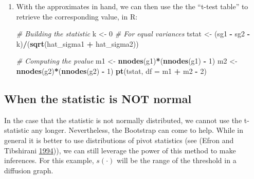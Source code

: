 \documentclass[]{book}
\newenvironment{Shaded}{\begin{snugshade}}{\end{snugshade}}
\newcommand{\CommentTok}[1]{\textcolor[rgb]{0.56,0.35,0.01}{\textit{#1}}}
\newcommand{\DataTypeTok}[1]{\textcolor[rgb]{0.13,0.29,0.53}{#1}}
\newcommand{\DecValTok}[1]{\textcolor[rgb]{0.00,0.00,0.81}{#1}}
\newcommand{\KeywordTok}[1]{\textcolor[rgb]{0.13,0.29,0.53}{\textbf{#1}}}
\newcommand{\NormalTok}[1]{#1}
\newcommand{\OperatorTok}[1]{\textcolor[rgb]{0.81,0.36,0.00}{\textbf{#1}}}
\newcommand{\StringTok}[1]{\textcolor[rgb]{0.31,0.60,0.02}{#1}}
\begin{document}
\begin{enumerate}
\begin{Shaded}
\end{Shaded}
\item
  With the approximates in hand, we can then use the the ``t-test table'' to
  retrieve the corresponding value, in R:

\begin{Shaded}
\begin{Highlighting}[]
\CommentTok{# Building the statistic}
\NormalTok{k <-}\StringTok{ }\DecValTok{0} \CommentTok{# For equal variances}
\NormalTok{tstat <-}\StringTok{ }\NormalTok{(sg1 }\OperatorTok{-}\StringTok{ }\NormalTok{sg2 }\OperatorTok{-}\StringTok{ }\NormalTok{k)}\OperatorTok{/}\NormalTok{(}\KeywordTok{sqrt}\NormalTok{(hat_sigma1 }\OperatorTok{+}\StringTok{ }\NormalTok{hat_sigma2))}

\CommentTok{# Computing the pvalue}
\NormalTok{m1 <-}\StringTok{ }\KeywordTok{nnodes}\NormalTok{(g1)}\OperatorTok{*}\NormalTok{(}\KeywordTok{nnodes}\NormalTok{(g1) }\OperatorTok{-}\StringTok{ }\DecValTok{1}\NormalTok{)}
\NormalTok{m2 <-}\StringTok{ }\KeywordTok{nnodes}\NormalTok{(g2)}\OperatorTok{*}\NormalTok{(}\KeywordTok{nnodes}\NormalTok{(g2) }\OperatorTok{-}\StringTok{ }\DecValTok{1}\NormalTok{)}
\KeywordTok{pt}\NormalTok{(tstat, }\DataTypeTok{df =}\NormalTok{ m1 }\OperatorTok{+}\StringTok{ }\NormalTok{m2 }\OperatorTok{-}\StringTok{ }\DecValTok{2}\NormalTok{)}
\end{Highlighting}
\end{Shaded}
\end{enumerate}

\hypertarget{when-the-statistic-is-not-normal}{%
\subsection{When the statistic is NOT normal}\label{when-the-statistic-is-not-normal}}

In the case that the statistic is not normally distributed, we cannot use the
t-statistic any longer. Nevertheless, the Bootstrap can come to help. While
in general it is better to use distributions of pivot statistics (see (Efron and Tibshirani \protect\hyperlink{ref-Efron1994}{1994})),
we can still leverage the power of this method to make inferences. For this
example, \(s(\cdot)\) will be the range of the threshold in a diffusion graph.
\end{document}
